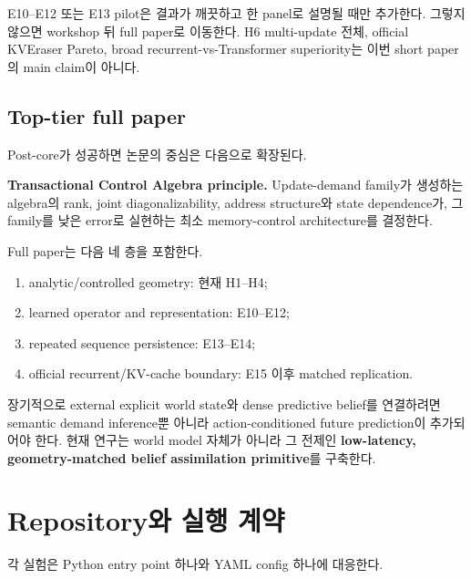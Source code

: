 \documentclass[10.3pt,a4paper]{article}
\begin{document}
E10--E12 또는 E13 pilot은 결과가 깨끗하고 한 panel로 설명될 때만 추가한다. 그렇지 않으면 workshop 뒤 full paper로 이동한다. H6 multi-update 전체, official KVEraser Pareto, broad recurrent-vs-Transformer superiority는 이번 short paper의 main claim이 아니다.

\subsection{Top-tier full paper}
Post-core가 성공하면 논문의 중심은 다음으로 확장된다.

\begin{claimbox}
\textbf{Transactional Control Algebra principle.} Update-demand family가 생성하는 algebra의 rank, joint diagonalizability, address structure와 state dependence가, 그 family를 낮은 error로 실현하는 최소 memory-control architecture를 결정한다.
\end{claimbox}

Full paper는 다음 네 층을 포함한다.
\begin{enumerate}
\item analytic/controlled geometry: 현재 H1--H4;
\item learned operator and representation: E10--E12;
\item repeated sequence persistence: E13--E14;
\item official recurrent/KV-cache boundary: E15 이후 matched replication.
\end{enumerate}

장기적으로 external explicit world state와 dense predictive belief를 연결하려면 semantic demand inference뿐 아니라 action-conditioned future prediction이 추가되어야 한다. 현재 연구는 world model 자체가 아니라 그 전제인 \textbf{low-latency, geometry-matched belief assimilation primitive}를 구축한다.

\section{Repository와 실행 계약}
각 실험은 Python entry point 하나와 YAML config 하나에 대응한다.
\end{document}
